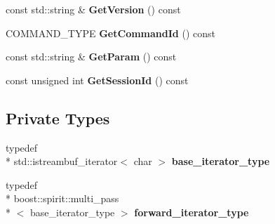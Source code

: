 \begin{DoxyCompactItemize}
\item 
\hypertarget{classhttp__server_1_1cRequest_a9f1fbe83f22a917f75085326b96a5577}{const std\-::string \& {\bfseries Get\-Version} () const }\label{classhttp__server_1_1cRequest_a9f1fbe83f22a917f75085326b96a5577}

\item 
\hypertarget{classhttp__server_1_1cRequest_a51ccd6f85abf1eb131bd3e2c10ad2f59}{C\-O\-M\-M\-A\-N\-D\-\_\-\-T\-Y\-P\-E {\bfseries Get\-Command\-Id} () const }\label{classhttp__server_1_1cRequest_a51ccd6f85abf1eb131bd3e2c10ad2f59}

\item 
\hypertarget{classhttp__server_1_1cRequest_a386946841d675edc9dbf5fd81d8de046}{const std\-::string \& {\bfseries Get\-Param} () const }\label{classhttp__server_1_1cRequest_a386946841d675edc9dbf5fd81d8de046}

\item 
\hypertarget{classhttp__server_1_1cRequest_ada8f38975ca9bb05bfe9b5b34aa985a5}{const unsigned int {\bfseries Get\-Session\-Id} () const }\label{classhttp__server_1_1cRequest_ada8f38975ca9bb05bfe9b5b34aa985a5}

\end{DoxyCompactItemize}
\subsection*{Private Types}
\begin{DoxyCompactItemize}
\item 
\hypertarget{classhttp__server_1_1cRequest_ab55878881ea0fad5b7801a7d3e67bc6f}{typedef \\*
std\-::istreambuf\-\_\-iterator$<$ char $>$ {\bfseries base\-\_\-iterator\-\_\-type}}\label{classhttp__server_1_1cRequest_ab55878881ea0fad5b7801a7d3e67bc6f}

\item 
\hypertarget{classhttp__server_1_1cRequest_a4c4ef5da2042acec5d8f9ff9f0a432c3}{typedef \\*
boost\-::spirit\-::multi\-\_\-pass\\*
$<$ base\-\_\-iterator\-\_\-type $>$ {\bfseries forward\-\_\-iterator\-\_\-type}}\label{classhttp__server_1_1cRequest_a4c4ef5da2042acec5d8f9ff9f0a432c3}

\end{DoxyCompactItemize}
